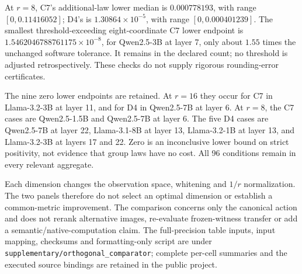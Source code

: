 At $r=8$, C7's additional-law lower median is $0.000778193$, with range $[0,0.11416052]$; D4's is $1.30864\times10^{-5}$, with range $[0,0.000401239]$. The smallest threshold-exceeding eight-coordinate C7 lower endpoint is $1.5462046788761175\times10^{-8}$, for Qwen2.5-3B at layer 7, only about $1.55$ times the unchanged software tolerance. It remains in the declared count; no threshold is adjusted retrospectively. These checks do not supply rigorous rounding-error certificates.

The nine zero lower endpoints are retained. At $r=16$ they occur for C7 in Llama-3.2-3B at layer 11, and for D4 in Qwen2.5-7B at layer 6. At $r=8$, the C7 cases are Qwen2.5-1.5B and Qwen2.5-7B at layer 6. The five D4 cases are Qwen2.5-7B at layer 22, Llama-3.1-8B at layer 13, Llama-3.2-1B at layer 13, and Llama-3.2-3B at layers 17 and 22. Zero is an inconclusive lower bound on strict positivity, not evidence that group laws have no cost. All 96 conditions remain in every relevant aggregate.

Each dimension changes the observation space, whitening and $1/r$ normalization. The two panels therefore do not select an optimal dimension or establish a common-metric improvement. The comparison concerns only the canonical action and does not rerank alternative images, re-evaluate frozen-witness transfer or add a semantic/native-computation claim. The full-precision table inputs, input mapping, checksums and formatting-only script are under \texttt{supplementary/orthogonal\_comparator}; complete per-cell summaries and the executed source bindings are retained in the public project.


